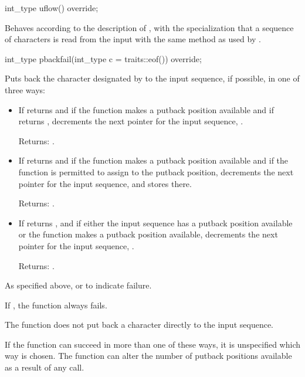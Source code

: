 %
\begin{itemdecl}
int_type uflow() override;
\end{itemdecl}

\begin{itemdescr}
\pnum
\effects
Behaves according to the description of
,
with the specialization that a sequence of characters is read from the input
with the same method as used by
.
\end{itemdescr}

%
\begin{itemdecl}
int_type pbackfail(int_type c = traits::eof()) override;
\end{itemdecl}

\begin{itemdescr}
\pnum
\effects
Puts back the character designated by  to the input
sequence, if possible, in one of three ways:
\begin{itemize}
\item
If
returns
and
if the function makes a putback position available
and if
returns
,
decrements the next pointer for the input sequence,
.

Returns:
.

\item
If
returns
and
if the function makes a putback position available
and if the function is permitted to assign to the putback position,
decrements the next pointer for the input sequence,
and stores  there.

Returns:
.

\item
If
returns
,
and if either the input sequence has a putback position available or
the function makes a putback position available,
decrements the next pointer for the input sequence,
.

Returns:
.
\end{itemize}

\pnum
\returns
As specified above, or
to indicate failure.

\pnum
\remarks
If
,
the function always fails.

\pnum
The function does not put back a character directly to the input sequence.

\pnum
If the function can succeed in more than one of these ways, it is
unspecified which way is chosen.
The function can alter the number of putback positions available as a result of any call.
\end{itemdescr}


